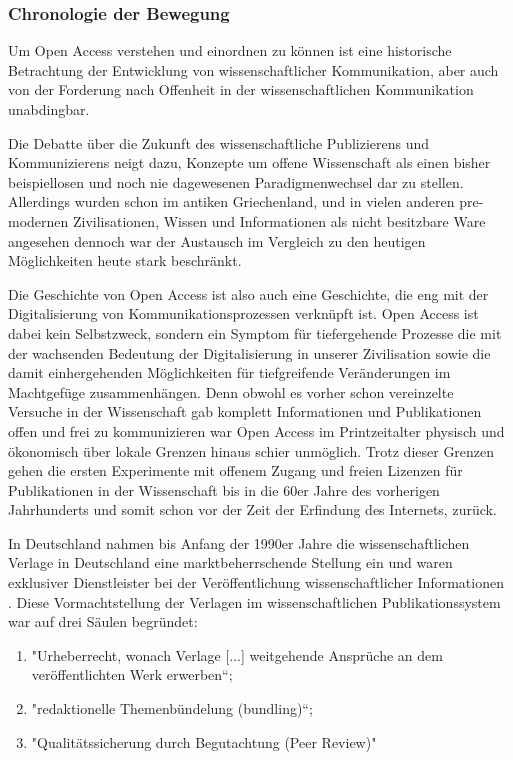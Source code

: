 \subsubsection{Chronologie der Bewegung}
Um Open Access verstehen und einordnen zu können ist eine historische Betrachtung der Entwicklung von wissenschaftlicher Kommunikation, aber auch von der Forderung nach Offenheit in der wissenschaftlichen Kommunikation unabdingbar. 

Die Debatte über die Zukunft des wissenschaftliche Publizierens und Kommunizierens neigt dazu, Konzepte um offene Wissenschaft als einen bisher beispiellosen und noch nie dagewesenen Paradigmenwechsel dar zu stellen\cite{cite:17a}\cite{cite:17b}. Allerdings wurden schon im antiken Griechenland, und in vielen anderen pre-modernen Zivilisationen, Wissen und Informationen als nicht besitzbare Ware angesehen\cite{cite:18} dennoch war der Austausch im Vergleich zu den heutigen Möglichkeiten heute stark beschränkt\cite{cite:17c}.

Die Geschichte von Open Access ist also auch eine Geschichte, die eng mit der Digitalisierung von Kommunikationsprozessen verknüpft ist. Open Access ist dabei kein Selbstzweck\cite{cite:17d}, sondern ein Symptom für tiefergehende Prozesse die mit der wachsenden Bedeutung der Digitalisierung in unserer Zivilisation sowie die damit einhergehenden Möglichkeiten für tiefgreifende Veränderungen im Machtgefüge zusammenhängen\cite{cite:17e}. Denn obwohl es vorher schon vereinzelte Versuche in der Wissenschaft gab komplett Informationen und Publikationen offen und frei zu kommunizieren war Open Access im Printzeitalter physisch und ökonomisch über lokale Grenzen hinaus schier unmöglich\cite{cite:18a}. Trotz dieser Grenzen gehen die ersten Experimente mit offenem Zugang und freien Lizenzen für Publikationen in der Wissenschaft bis in die 60er Jahre des vorherigen Jahrhunderts und somit schon vor der Zeit der Erfindung des Internets, zurück\cite{cite:18b}. 

In Deutschland nahmen bis Anfang der 1990er Jahre die wissenschaftlichen Verlage in Deutschland eine marktbeherrschende Stellung ein und waren exklusiver Dienstleister bei der Veröffentlichung wissenschaftlicher Informationen \cite{schloegl_2005}\cite{offhaus_2012_institutionelle_repos}. Diese Vormachtstellung der Verlagen im wissenschaftlichen Publikationssystem war auf drei Säulen begründet\cite{offhaus_2012_institutionelle_repos}\cite{bargheer_2006_open}: 
\begin{enumerate}
\item  "Urheberrecht, wonach Verlage [...] weitgehende Ansprüche an dem veröffentlichten Werk erwerben“;
\item "redaktionelle Themenbündelung (bundling)“;
\item "Qualitätssicherung durch Begutachtung (Peer Review)"
\end{enumerate}

